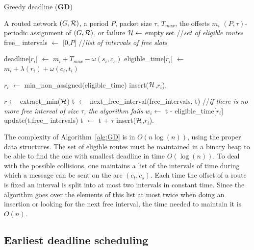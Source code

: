 \documentclass[10pt, conference, letterpaper]{IEEEtran}
\begin{document}
      \begin{algorithm}\label{alg:GD}
     \caption{ Greedy deadline ({\bf GD}) }
     \begin{algorithmic}
     \REQUIRE A routed network $(G,{\cal R})$, a period $P$, packet size $\tau$, $ T_{max}$, the offsets $m_i$
     \ENSURE $(P,\tau)$-periodic assignment of $(G,{\cal R})$, or failure
    \STATE  ${\cal H} \leftarrow$ empty set //{\em set of eligible routes}
        \STATE  free\_ intervals $\leftarrow$ [0,$P$] //{\em list of intervals of free slots}
   
     \STATE  deadline[$r_i$]  $\leftarrow$  $m_{i} + T_{max} - \omega(s_i,c_s)$
     \STATE  eligible\_time[$r_i$] $\leftarrow$ $m_{i} +  \lambda(r_i) + \omega(c_t,t_i)$
       \ENDFOR
       
       \STATE $r_i$ $\leftarrow $ min\_non\_assigned(eligible\_time)
       \STATE insert(${\cal H}$,$r_i$).
       \ENDIF
      
       \STATE $r \leftarrow $ extract\_min(${\cal H}$)
       \STATE t $\leftarrow$ next\_free\_interval(free\_intervals, t) //{\em if there is no more free interval of size $\tau$, the algorithm fails}
       \STATE $w_i \leftarrow$ t - eligible\_time[$r_i$]
       \STATE update(t,free\_ intervals)
       \STATE t $\leftarrow$ t + $\tau$
 \STATE insert(${\cal H}$,$r_i$).
       \ENDFOR
       \ENDWHILE

     
 
     \end{algorithmic}
     \end{algorithm}


    The complexity of Algorithm~\ref{alg:GD} is in $O(n\log(n))$, using the proper data structures.
    The set of eligible routes must be maintained in a binary heap
    to be able to find the one with smallest deadline in time $O(\log(n))$. 
    To deal with the possible collisions, one maintains a list of the intervals
    of time during which a message can be sent on the arc $(c_t,c_s)$. Each time the offset of a 
    route is fixed an interval is split into at most two intervals in constant time. 
    Since the algorithm goes over the elements of this list at most twice when doing an insertion
    or looking for the next free interval, the time needed to maintain it is $O(n)$. 
  
     \subsection{Earliest deadline scheduling}\label{sec:braheuristic}
     
\end{document}
